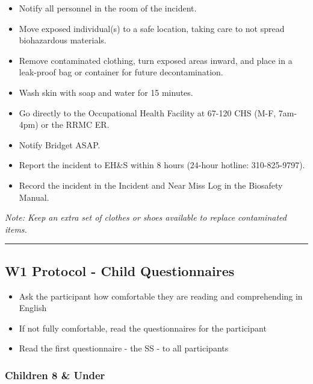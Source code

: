\documentclass[]{book}
\providecommand{\tightlist}{%
  \setlength{\itemsep}{0pt}\setlength{\parskip}{0pt}}
\begin{document}
\begin{itemize}
\tightlist
\item
  Notify all personnel in the room of the incident.
\item
  Move exposed individual(s) to a safe location, taking care to not spread biohazardous materials.
\item
  Remove contaminated clothing, turn exposed areas inward, and place in a leak-proof bag or container for future decontamination.
\item
  Wash skin with soap and water for 15 minutes.
\item
  Go directly to the Occupational Health Facility at 67-120 CHS (M-F, 7am-4pm) or the RRMC ER.
\item
  Notify Bridget ASAP.
\item
  Report the incident to EH\&S within 8 hours (24-hour hotline: 310-825-9797).
\item
  Record the incident in the Incident and Near Miss Log in the Biosafety Manual.
\end{itemize}

\emph{Note: Keep an extra set of clothes or shoes available to replace contaminated items.}

\begin{center}\rule{0.5\linewidth}{0.5pt}\end{center}

\hypertarget{w1-protocol---child-questionnaires}{%
\subsection{W1 Protocol - Child Questionnaires}\label{w1-protocol---child-questionnaires}}

\begin{itemize}
\tightlist
\item
  Ask the participant how comfortable they are reading and comprehending in English
\item
  If not fully comfortable, read the questionnaires for the participant
\item
  Read the first questionnaire - the SS - to all participants
\end{itemize}

\hypertarget{children-8-under}{%
\subsubsection{Children 8 \& Under}\label{children-8-under}}
\end{document}
